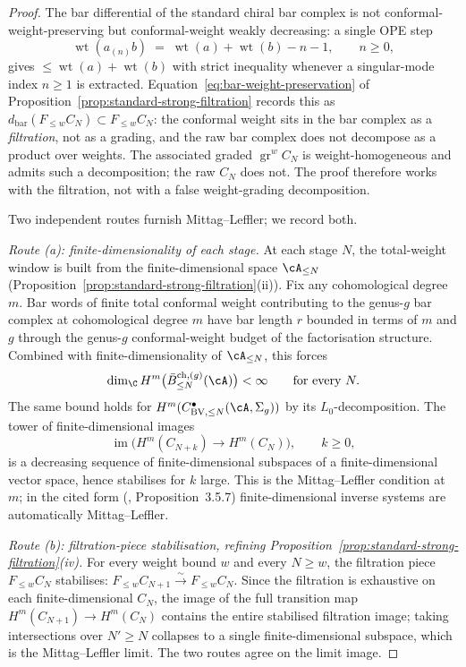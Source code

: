 \begin{proof}
The bar differential of the standard chiral bar complex is not
conformal-weight-preserving but conformal-weight weakly decreasing: a
single OPE step
\[
\operatorname{wt}(a_{(n)}b)
\;=\;
\operatorname{wt}(a) + \operatorname{wt}(b) - n - 1,
\qquad n \geq 0,
\]
gives $\le \operatorname{wt}(a) + \operatorname{wt}(b)$ with strict
inequality whenever a singular-mode index $n \geq 1$ is extracted.
Equation~\textup{\eqref{eq:bar-weight-preservation}} of
Proposition~\textup{\ref{prop:standard-strong-filtration}} records this
as $d_{\mathrm{bar}}(F_{\leq w} C_N) \subset F_{\leq w} C_N$: the
conformal weight sits in the bar complex as a \emph{filtration}, not as
a grading, and the raw bar complex does not decompose as a product
over weights. The associated graded $\operatorname{gr}^w C_N$ is
weight-homogeneous and admits such a decomposition; the raw $C_N$ does
not. The proof therefore works with the filtration, not with a false
weight-grading decomposition.

Two independent routes furnish Mittag--Leffler; we record both.

\emph{Route (a): finite-dimensionality of each stage.} At each stage
$N$, the total-weight window is built from the finite-dimensional
space $\cA_{\leq N}$
\textup{(}Proposition~\textup{\ref{prop:standard-strong-filtration}}(ii)\textup{)}.
Fix any cohomological degree $m$. Bar words of finite total
conformal weight contributing to the genus-$g$ bar complex at
cohomological degree $m$ have bar length $r$ bounded in terms of $m$
and $g$ through the genus-$g$ conformal-weight budget of the
factorisation structure. Combined with finite-dimensionality of
$\cA_{\leq N}$, this forces
\[
\dim_\C H^m\bigl(\bar B^{\mathrm{ch},(g)}_{\leq N}(\cA)\bigr) < \infty
\qquad
\text{for every } N.
\]
The same bound holds for
$H^m(C^{\bullet}_{\mathrm{BV},\leq N}(\cA, \Sigma_g))$
by its $L_0$-decomposition. The tower of finite-dimensional images
\[
\operatorname{im}\bigl(H^m(C_{N+k}) \longrightarrow H^m(C_N)\bigr),
\qquad k \geq 0,
\]
is a decreasing sequence of finite-dimensional subspaces of a
finite-dimensional vector space, hence stabilises for $k$ large. This
is the Mittag--Leffler condition at $m$; in the cited form
\textup{(}\cite{Weibel94}, Proposition~3.5.7\textup{)} finite-dimensional
inverse systems are automatically Mittag--Leffler.

\emph{Route (b): filtration-piece stabilisation, refining
Proposition~\textup{\ref{prop:standard-strong-filtration}}(iv).} For
every weight bound $w$ and every $N \geq w$, the filtration piece
$F_{\leq w} C_N$ stabilises:
$F_{\leq w} C_{N+1} \xrightarrow{\sim} F_{\leq w} C_N$. Since the
filtration is exhaustive on each finite-dimensional $C_N$, the image
of the full transition map $H^m(C_{N+1}) \to H^m(C_N)$ contains the
entire stabilised filtration image; taking intersections over
$N' \geq N$ collapses to a single finite-dimensional subspace, which
is the Mittag--Leffler limit. The two routes agree on the limit image.


\end{proof}
